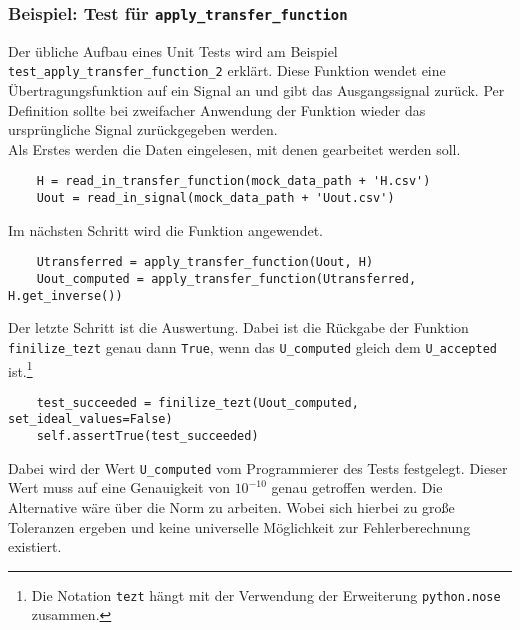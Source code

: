 \documentclass[../Report.tex]{subfiles}
\begin{document}
\subsubsection{Beispiel: Test für \lstinline{apply_transfer_function}}
\label{subsubsec.code.tdd.example}
Der übliche Aufbau eines Unit Tests wird am Beispiel \lstinline{test_apply_transfer_function_2} erklärt. Diese Funktion wendet eine Übertragungsfunktion auf ein Signal an und gibt das Ausgangssignal zurück. Per Definition sollte bei zweifacher Anwendung der Funktion wieder das ursprüngliche Signal zurückgegeben werden.\\
Als Erstes werden die Daten eingelesen, mit denen gearbeitet werden soll.
\lstset{language=Python}
\begin{lstlisting}
	H = read_in_transfer_function(mock_data_path + 'H.csv')
	Uout = read_in_signal(mock_data_path + 'Uout.csv')	
\end{lstlisting}
Im nächsten Schritt wird die Funktion angewendet.
\lstset{language=Python}
\begin{lstlisting}
	Utransferred = apply_transfer_function(Uout, H)
	Uout_computed = apply_transfer_function(Utransferred, H.get_inverse())	
\end{lstlisting}
Der letzte Schritt ist die Auswertung. Dabei ist die Rückgabe der Funktion \lstinline{finilize_tezt} genau dann \lstinline{True}, wenn das \lstinline{U_computed} gleich dem \lstinline{U_accepted} ist.\footnote{Die Notation \lstinline{tezt} hängt mit der Verwendung der Erweiterung \lstinline{python.nose} zusammen.}
\lstset{language=Python}
\begin{lstlisting}
	test_succeeded = finilize_tezt(Uout_computed, set_ideal_values=False)
	self.assertTrue(test_succeeded)
\end{lstlisting}
Dabei wird der Wert \lstinline{U_computed} vom Programmierer des Tests festgelegt. Dieser Wert muss auf eine Genauigkeit von $10^{-10}$ genau getroffen werden. Die Alternative wäre über die Norm zu arbeiten. Wobei sich hierbei zu große Toleranzen ergeben und keine universelle Möglichkeit zur Fehlerberechnung existiert.
\end{document}
